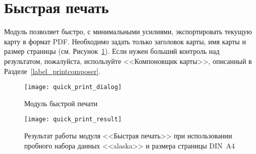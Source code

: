 
\section{Быстрая печать}\label{quickprint}


Модуль  позволяет быстро, с
минимальными усилиями, экспортировать текущую карту в формат PDF. Необходимо
задать только заголовок карты, имя карты и размер страницы
(см. Рисунок~\ref{fig:quickprint}). Если нужен больший контроль над
результатом, пожалуйста, используйте <<Компоновщик карты>>, описанный в
Разделе~\ref{label_printcomposer}.

\begin{figure}[ht]
   \centering
   \texttt{[image: quick\_print\_dialog]}
   \caption{Модуль быстрой печати \wincaption}\label{fig:quickprint}
\end{figure}

\begin{figure}[ht]
   \centering
   \texttt{[image: quick\_print\_result]}
   \caption{Результат работы модуля <<Быстрая печать>> при использовании пробного
   набора данных <<alaska>> и размера страницы DIN~A4 \wincaption}\label{fig:quickprint_result}
\end{figure}

\FloatBarrier
